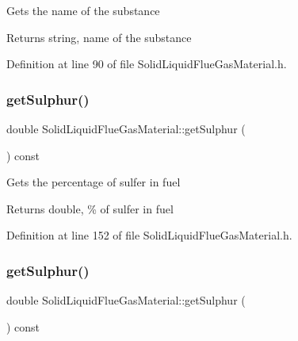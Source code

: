 Gets the name of the substance \begin{DoxyReturn}{Returns}
string, name of the substance 
\end{DoxyReturn}


Definition at line 90 of file Solid\+Liquid\+Flue\+Gas\+Material.\+h.

\mbox{\label{class_solid_liquid_flue_gas_material_abe35d8ff283bfa5aadcf00f9906025ae}} 
\subsubsection{\texorpdfstring{get\+Sulphur()}{getSulphur()}\hspace{0.1cm}{\footnotesize\ttfamily [1/3]}}
{\footnotesize\ttfamily double Solid\+Liquid\+Flue\+Gas\+Material\+::get\+Sulphur (\begin{DoxyParamCaption}{ }\end{DoxyParamCaption}) const\hspace{0.3cm}{\ttfamily [inline]}}

Gets the percentage of sulfer in fuel \begin{DoxyReturn}{Returns}
double, \% of sulfer in fuel 
\end{DoxyReturn}


Definition at line 152 of file Solid\+Liquid\+Flue\+Gas\+Material.\+h.

\mbox{\label{class_solid_liquid_flue_gas_material_abe35d8ff283bfa5aadcf00f9906025ae}} 
\subsubsection{\texorpdfstring{get\+Sulphur()}{getSulphur()}\hspace{0.1cm}{\footnotesize\ttfamily [2/3]}}
{\footnotesize\ttfamily double Solid\+Liquid\+Flue\+Gas\+Material\+::get\+Sulphur (\begin{DoxyParamCaption}{ }\end{DoxyParamCaption}) const\hspace{0.3cm}{\ttfamily [inline]}}

